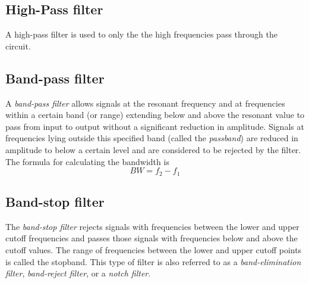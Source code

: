 \subsection{High-Pass filter}
A high-pass filter is used to only the the high frequencies pass through the circuit. 

\subsection{Band-pass filter}
A \emph{band-pass filter} allows signals at the resonant frequency and at frequencies within a certain band (or range) extending below and above the resonant value to pass from input to output without a significant reduction in amplitude. Signals at frequencies lying outside this specified band (called the \emph{passband}) are reduced in amplitude to below a certain level and are considered to be rejected by the filter.
The formula for calculating the bandwidth is 
\[BW = f_2 - f_1\]

\subsection{Band-stop filter}
The \emph{band-stop filter} rejects signals with frequencies between the lower and upper cutoff frequencies and passes those signals with frequencies below and above the cutoff values. The range of frequencies between the lower and upper cutoff points is called the stopband. This type of filter is also referred to as a \emph{band-elimination filter}, \emph{band-reject filter}, or a \emph{notch filter}. 
